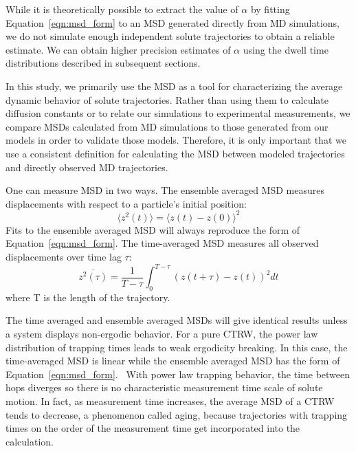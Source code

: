 \documentclass[aps,pre,preprint,groupedaddress,longbibliography]{revtex4-2}
\begin{document}
  While it is theoretically possible to extract the value of $\alpha$ by fitting
  Equation~\ref{eqn:msd_form} to an MSD generated directly from MD simulations, 
  we do not simulate enough independent solute trajectories to obtain a reliable
  estimate. We can obtain higher precision estimates of $\alpha$ using the dwell
  time distributions described in subsequent sections.

  In this study, we primarily use the MSD as a tool for characterizing the average
  dynamic behavior of solute trajectories. Rather than using them to calculate 
  diffusion constants or to relate our simulations to experimental measurements, we
  compare MSDs calculated from MD simulations to those generated from our models 
  in order to validate those models. Therefore, it is only important that we use a
  consistent definition for calculating the MSD between modeled trajectories and
  directly observed MD trajectories.

  One can measure MSD in two ways. The ensemble averaged MSD measures 
  displacements with respect to a particle's initial position:
  \begin{equation}
  \langle z^2(t) \rangle = \langle z(t) - z(0) \rangle^2
  \label{eqn:ensemble_msd}
  \end{equation}
  Fits to the ensemble averaged MSD will always reproduce the form of 
  Equation~\ref{eqn:msd_form}. The time-averaged MSD measures all observed 
  displacements over time lag $\tau$: 
  \begin{equation}
  \overline{z^2(\tau)} = \dfrac{1}{T - \tau}\int_{0}^{T - \tau} (z(t + \tau) - z(t))^2 dt
  \label{eqn:tamsd}
  \end{equation}
  where T is the length of the trajectory. 
  
  The time averaged and ensemble averaged MSDs will give identical results 
  unless a system displays non-ergodic behavior. For a pure CTRW, the power 
  law distribution of trapping times leads to weak ergodicity breaking.
  In this case, the time-averaged MSD is linear while the ensemble averaged
  MSD has the form of Equation~\ref{eqn:msd_form}.~\cite{meroz_toolbox_2015} With
  power law trapping behavior, the time between hops diverges so there is no 
  characteristic measurement time scale of solute motion. In fact, as measurement 
  time increases, the average MSD of a CTRW tends to decrease, a phenomenon called
  aging, because trajectories with trapping times on the order of the measurement 
  time get incorporated into the calculation.~\cite{bel_weak_2005}
  
\end{document}
